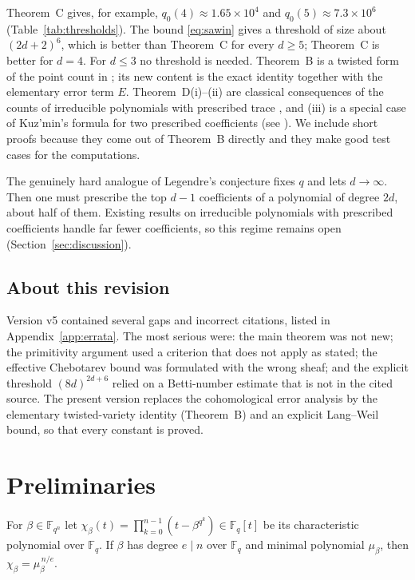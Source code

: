 \documentclass[11pt,a4paper]{article}
\theoremstyle{definition}
\theoremstyle{remark}
\newcommand{\Fq}{\mathbb{F}_q}
\begin{document}
Theorem~C gives, for example, $q_0(4)\approx1.65\times10^{4}$ and
$q_0(5)\approx7.3\times10^{6}$ (Table~\ref{tab:thresholds}).
The bound \eqref{eq:sawin} gives a threshold of size about $(2d+2)^6$, which is better than
Theorem~C for every $d\ge5$; Theorem~C is better for $d=4$. For $d\le3$ no threshold is needed.
Theorem~B is a twisted form of the point count in \cite{Sawin2021}; its new content is the exact
identity together with the elementary error term $E$.
Theorem~D(i)--(ii) are classical consequences of the counts of irreducible
polynomials with prescribed trace \cite{Carlitz1952}, and (iii) is a special
case of Kuz'min's formula for two prescribed coefficients
(see \cite{LL2016,MY2016}). We include short proofs because they come out of
Theorem~B directly and they make good test cases for the computations.

The genuinely hard analogue of Legendre's conjecture fixes $q$ and lets
$d\to\infty$. Then one must prescribe the top $d-1$ coefficients of a
polynomial of degree $2d$, about half of them.
Existing results on irreducible polynomials with prescribed coefficients
\cite{Pollack2013,Ha2016} handle far fewer coefficients, so this regime
remains open (Section~\ref{sec:discussion}).

\subsection{About this revision}
Version v5 \cite{ChenV5} contained several gaps and incorrect citations,
listed in Appendix~\ref{app:errata}. The most serious were:
the main theorem was not new; the primitivity argument used a criterion that
does not apply as stated; the effective Chebotarev bound was formulated with
the wrong sheaf; and the explicit threshold $(8d)^{2d+6}$ relied on a
Betti-number estimate that is not in the cited source.
The present version replaces the cohomological error analysis by the
elementary twisted-variety identity (Theorem~B) and an explicit Lang--Weil
bound, so that every constant is proved.

\section{Preliminaries}\label{sec:prelim}

For $\beta\in\mathbb{F}_{q^{n}}$ let
$\chi_\beta(t)=\prod_{k=0}^{n-1}(t-\beta^{q^k})\in\Fq[t]$ be its
characteristic polynomial over $\Fq$. If $\beta$ has degree $e\mid n$ over $\Fq$
and minimal polynomial $\mu_\beta$, then $\chi_\beta=\mu_\beta^{\,n/e}$.
\end{document}
